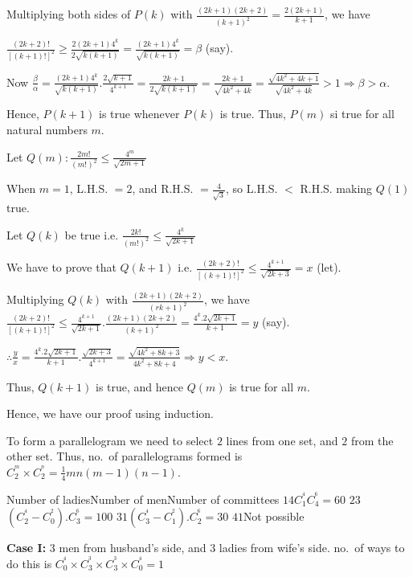   Multiplying both sides of $P(k)$ with $\frac{(2k + 1)(2k + 2)}{(k + 1)^2} = \frac{2(2k + 1)}{k + 1}$, we
  have

  $\frac{(2k + 2)!}{[(k + 1)!]^2}\geq \frac{2(2k + 1)4^k}{2\sqrt{k(k + 1)}} = \frac{(2k + 1)4^k}{\sqrt{k(k +
      1)}} = \beta$ (say).

  Now $\frac{\beta}{\alpha} = \frac{(2k + 1)4^k}{\sqrt{k(k + 1)}}.\frac{2\sqrt{k + 1}}{4^{k + 1}} = \frac{2k
  + 1}{2\sqrt{k(k + 1)}} = \frac{2k + 1}{\sqrt{4k^2 + 4k}} = \frac{\sqrt{4k^2 + 4k + 1}}{\sqrt{4k^2 + 4k}} >
  1 \Rightarrow \beta > \alpha$.

  Hence, $P(k + 1)$ is true whenever $P(k)$ is true. Thus, $P(m)$ si true for all natural numbers $m$.

  Let $Q(m): \frac{2m!}{(m!)^2}\leq \frac{4^m}{\sqrt{2m + 1}}$

  When $m = 1$, L.H.S. $= 2$, and R.H.S. $= \frac{4}{\sqrt{3}}$, so L.H.S. $<$ R.H.S. making $Q(1)$ true.

  Let $Q(k)$ be true i.e. $\frac{2k!}{(m!)^2}\leq \frac{4^k}{\sqrt{2k + 1}}$

  We have to prove that $Q(k + 1)$ i.e. $\frac{(2k + 2)!}{[(k + 1)!]^2}\leq\frac{4^{k + 1}}{\sqrt{2k + 3}} =
  x$ (let).

  Multiplying $Q(k)$ with $\frac{(2k + 1)(2k + 2)}{(rk + 1)^2}$, we have $\frac{(2k + 2)!}{[(k + 1)!]^2}\leq
  \frac{4^{k + 1}}{\sqrt{2k + 1}}.\frac{(2k + 1)(2k + 2)}{(k + 1)^2} = \frac{4^k.2\sqrt{2k + 1}}{k + 1} = y$
  (say).

  $\therefore \frac{y}{x} = \frac{4^k.2\sqrt{2k + 1}}{k + 1}.\frac{\sqrt{2k + 3}}{4^{k + 1}} =
  \frac{\sqrt{4k^2 + 8k + 3}}{4k^2 + 8k + 4}\Rightarrow y < x$.

  Thus, $Q(k + 1)$ is true, and hence $Q(m)$ is true for all $m$.

  Hence, we have our proof using induction.
\item To form a parallelogram we need to select $2$ lines from one set, and $2$ from the other set. Thus,
  no.\ of parallelograms formed is $C_2^^m\times C_2^^n = \frac{1}{4}mn(m - 1)(n - 1)$.
\item \starttabulate[|c|c|l|]
  \NC Number of ladies\NC Number of men\NC Number of committees\NC\NR
  \NC $1$\NC $4$\NC $C_1^^4C_4^^6 = 60$\NC\NR
  \NC $2$\NC $3$\NC $(C_2^^4 - C_0^^2).C_3^^6 = 100$\NC\NR
  \NC $3$\NC $1$\NC $(C_3^^4 - C_1^^2).C_2^^6 = 30$\NC\NR
  \NC $4$\NC $1$\NC Not possible\NC\NR
\stoptabulate
\item {\bf Case I:} $3$ men from husband's side, and $3$ ladies from wife's side. no.\ of ways to do this is
  $C_0^^4\times C_3^^3\times C_3^^3\times C_0^^4 = 1$

